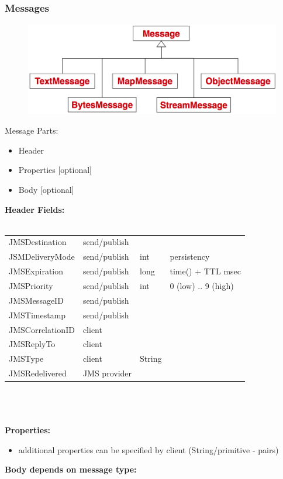 \documentclass[10pt]{article}
\begin{document}
\subsubsection{Messages}
\begin{figure}
	\centering
	\includegraphics[scale=0.2]{images/jms-api-message.png}%
\end{figure}
Message Parts:
\begin{itemize}
	\item Header
	\item Properties [optional]
	\item Body [optional]
\end{itemize}
\textbf{Header Fields:} \\ \\
\begin{tabular}{l l l l}
	JMSDestination & send/publish \\
	JSMDeliveryMode & send/publish & int & persistency \\
	JMSExpiration & send/publish & long & time() + TTL msec \\
	JMSPriority & send/publish & int & 0 (low) .. 9 (high) \\
	JMSMessageID & send/publish \\
	JMSTimestamp & send/publish \\
	JMSCorrelationID & client \\
	JMSReplyTo & client \\
	JMSType	 & client & String \\
	JMSRedelivered & JMS provider \\
\end{tabular} \\ \\ \\
\textbf{Properties: }
\begin{itemize}
	\item additional properties can be specified by client (String/primitive - pairs)
\end{itemize}
\textbf{Body depends on message type:}
\end{document}
